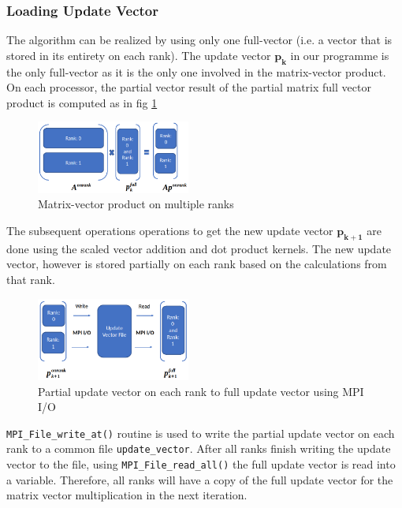 \documentclass[sigplan,screen]{acmart}
\begin{document}
\subsubsection{Loading Update Vector}
The algorithm can be realized by using only one full-vector (i.e. a vector that is stored in its entirety on each rank). The update vector $\mathbf{p_k}$ in our programme is the only full-vector as it is the only one involved in the matrix-vector product. On each processor, the partial vector result of the partial matrix full vector product is computed as in fig \ref{fig2}
\begin{figure}[H]
	\begin{center}
		\includegraphics[width=0.45\textwidth]{mpio_Ap.png}
	\end{center}
	\caption{Matrix-vector product on multiple ranks}
	\label{fig2} 
\end{figure}
The subsequent operations operations to get the new update vector $\mathbf{p_{k+1}}$ are done using the scaled vector addition and dot product kernels. The new update vector, however is stored partially on each rank based on the calculations from that rank.
\begin{figure}[H]
	\begin{center}
		\includegraphics[width=0.45\textwidth]{mpio_pupdate.png}
	\end{center}
	\caption{Partial update vector on each rank to full update vector using MPI I/O}
	\label{fig3} 
\end{figure}

\texttt{MPI\_File\_write\_at()} routine is used to write the partial update vector on each rank to a common file \texttt{update\_vector}. After all ranks finish writing the update vector to the file, using \texttt{MPI\_File\_read\_all()} the full update vector is read into a variable. Therefore, all ranks will have a copy of the full update vector for the matrix vector multiplication in the next iteration.
\end{document}
